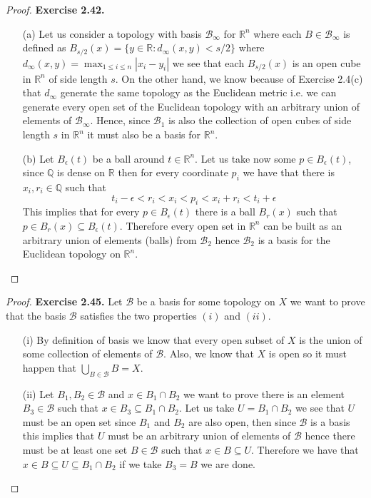 \documentclass[11pt]{article}
\newcommand{\Q}{\mathbb{Q}}
\newcommand{\R}{\mathbb{R}}
\theoremstyle{definition}
\begin{document}
\cleardoublepage
\begin{proof}{\textbf{Exercise 2.42.}}
\begin{itemize}
    \item [(a)] Let us consider a topology with basis $\mathcal{B}_\infty$
    for $\R^n$ where each $B \in \mathcal{B}_\infty$ is defined as
    $B_{s/2}(x) = \{y \in \R: d_\infty(x,y) < s/2\}$ where
    $d_\infty(x,y) = \max_{1 \leq i \leq n}|x_i - y_i|$
    we see that each $B_{s/2}(x)$ is an open cube in $\R^n$ of side length $s$.
    On the other hand, we know because of Exercise 2.4(c) that
    $d_{\infty}$ generate the same topology as the Euclidean metric
    i.e. we can generate every open set of the Euclidean topology with
    an arbitrary union of elements of $\mathcal{B}_\infty$. Hence,
    since $\mathcal{B}_1$ is also the collection of open cubes of side length
    $s$ in $\R^{n}$ it must also be a basis for $\R^{n}$.

    \item [(b)] Let $B_{\epsilon}(t)$ be a ball around $t \in \R^n$.
    Let us take now some $p \in B_{\epsilon}(t)$,
    since $\Q$ is dense on $\R$ then for every 
    coordinate $p_i$ we have that there is $x_i, r_i \in \Q$ such that
    $$t_i - \epsilon < r_i < x_i < p_i < x_i + r_i < t_i + \epsilon$$
    This implies that for every $p \in B_{\epsilon}(t)$ there is a ball
    $B_{r}(x)$ such that $ p \in B_{r}(x) \subseteq B_{\epsilon}(t)$.
    Therefore every open set in $\R^n$ can be built as an arbitrary union
    of elements (balls) from $\mathcal{B}_2$ hence $\mathcal{B}_2$
    is a basis for the Euclidean topology on $\R^n$.
\end{itemize}
\end{proof}
\cleardoublepage
\begin{proof}{\textbf{Exercise 2.45.}}
Let $\mathcal{B}$ be a basis for some topology on $X$ we want to prove that
the basis $\mathcal{B}$ satisfies the two properties $(i)$ and $(ii)$.
\begin{itemize}
    \item [(i)] By definition of basis we know that every open subset
    of $X$ is the union of some collection of elements of $\mathcal{B}$.
    Also, we know that $X$ is open so it must happen that
    $\bigcup_{B \in \mathcal{B}} B = X$.

    \item [(ii)] Let $B_1,B_2 \in \mathcal{B}$ and $x \in B_1 \cap B_2$ we want
    to prove there is an element $B_3 \in \mathcal{B}$ such that
    $x \in B_3 \subseteq B_1 \cap B_2$.
    Let us take $U = B_1 \cap B_2$ we see that $U$ must be an open set since
    $B_1$ and $B_2$ are also open, then since $\mathcal{B}$ is a basis
    this implies that $U$ must be an arbitrary union of elements of
    $\mathcal{B}$ hence there must be at least
    one set $B \in \mathcal{B}$ such that $x \in B \subseteq U$.
    Therefore we have that $x \in B \subseteq U \subseteq B_1 \cap B_2$
    if we take $B_3 = B$ we are done.
\end{itemize}
\end{proof}
\end{document}
